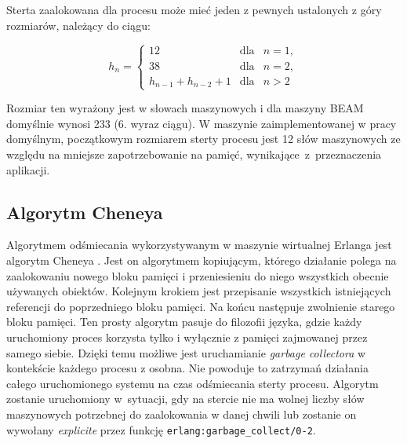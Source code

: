 Sterta zaalokowana dla procesu może mieć jeden z pewnych ustalonych z góry rozmiarów, należący do ciągu:

\begin{equation}
h_{n} = \left\lbrace
\begin{array}{rcl}
12 & \text{dla} & n = 1,\\
38 & \text{dla} & n = 2,\\
h_{n-1} + h_{n-2} + 1 & \text{dla} & n > 2
\end{array}
\right.
\end{equation}

Rozmiar ten wyrażony jest w słowach maszynowych i dla maszyny BEAM domyślnie wynosi 233 (6. wyraz ciągu).
W maszynie zaimplementowanej w pracy domyślnym, początkowym rozmiarem sterty procesu jest 12 słów maszynowych ze względu na mniejsze zapotrzebowanie na pamięć, wynikające~z~przeznaczenia aplikacji.

\subsection{Algorytm Cheneya}
\label{sub:gcCheney}

Algorytmem odśmiecania wykorzystywanym w maszynie wirtualnej Erlanga jest algorytm Cheneya \cite{Cheney1970}.
Jest on algorytmem kopiującym, którego działanie polega na zaalokowaniu nowego bloku pamięci i przeniesieniu do niego wszystkich obecnie używanych obiektów.
Kolejnym krokiem jest przepisanie wszystkich istniejących referencji do poprzedniego bloku pamięci.
Na końcu następuje zwolnienie starego bloku pamięci.
Ten prosty algorytm pasuje do filozofii języka, gdzie każdy uruchomiony proces korzysta tylko i wyłącznie z pamięci zajmowanej przez samego siebie.
Dzięki temu możliwe jest uruchamianie \emph{garbage collectora} w kontekście każdego procesu z osobna.
Nie powoduje to zatrzymań działania całego uruchomionego systemu na czas odśmiecania sterty procesu.
Algorytm zostanie uruchomiony w~sytuacji, gdy na stercie nie ma wolnej liczby słów maszynowych potrzebnej do zaalokowania w danej chwili lub zostanie on wywołany \emph{explicite} przez funkcję \texttt{erlang:garbage\_collect/0-2}.

